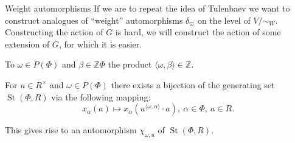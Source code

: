 \documentclass[handout]{beamer} %
\DeclareMathOperator{\St}{St}
\theoremstyle{definition}
\begin{document}
\begin{frame}{Weight automorphisms}
 If we are to repeat the idea of Tulenbaev we want to construct analogues of ``weight'' automorphisms $\delta_\varpi$ on the level of $V/\sim_W$.
\pause
Constructing the action of $G$ is hard, we will construct the action of some extension of $G$, for which it is easier.

 \medbreak

 To $\omega \in P(\Phi)$ and $\beta \in \mathbb{Z} \Phi$ the product $\langle \omega, \beta\rangle \in \mathbb{Z}$.
\pause

 For $u \in R^\times$ and $\omega \in P(\Phi)$ there exists a bijection of the generating set $\St(\Phi, R)$ via the following mapping:
 \[ x_\alpha(a) \mapsto x_\alpha(u^{\langle\omega, \alpha\rangle} \cdot a),\ \alpha\in \Phi,\ a \in R. \]
\pause

 This gives rise to an automorphism $\chi_{\omega, u}$ of $\St(\Phi, R)$.
\end{frame}
\end{document}
